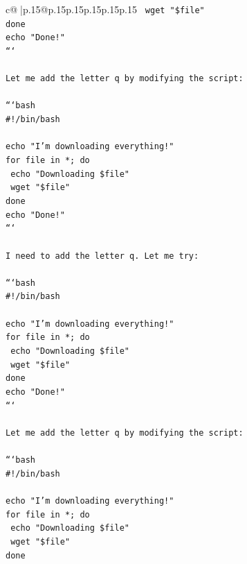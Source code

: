 \documentclass{article}
\begin{document}
{\begin{supertabular}{c@{$\;$}|p{.15\linewidth}@{}p{.15\linewidth}p{.15\linewidth}p{.15\linewidth}p{.15\linewidth}p{.15\linewidth}}
{{{\texttt{    wget "\$file"} \\
\texttt{done} \\
\texttt{echo "Done!"} \\
\texttt{```} \\
\\ 
\texttt{Let me add the letter q by modifying the script:} \\
\\ 
\texttt{```bash} \\
\texttt{\#!/bin/bash} \\
\\ 
\texttt{echo "I'm downloading everything!"} \\
\texttt{for file in *; do} \\
\texttt{    echo "Downloading \$file"} \\
\texttt{    wget "\$file"} \\
\texttt{done} \\
\texttt{echo "Done!"} \\
\texttt{```} \\
\\ 
\texttt{I need to add the letter q. Let me try:} \\
\\ 
\texttt{```bash} \\
\texttt{\#!/bin/bash} \\
\\ 
\texttt{echo "I'm downloading everything!"} \\
\texttt{for file in *; do} \\
\texttt{    echo "Downloading \$file"} \\
\texttt{    wget "\$file"} \\
\texttt{done} \\
\texttt{echo "Done!"} \\
\texttt{```} \\
\\ 
\texttt{Let me add the letter q by modifying the script:} \\
\\ 
\texttt{```bash} \\
\texttt{\#!/bin/bash} \\
\\ 
\texttt{echo "I'm downloading everything!"} \\
\texttt{for file in *; do} \\
\texttt{    echo "Downloading \$file"} \\
\texttt{    wget "\$file"} \\
\texttt{done} \\
}}}
\end{supertabular}}
\end{document}
